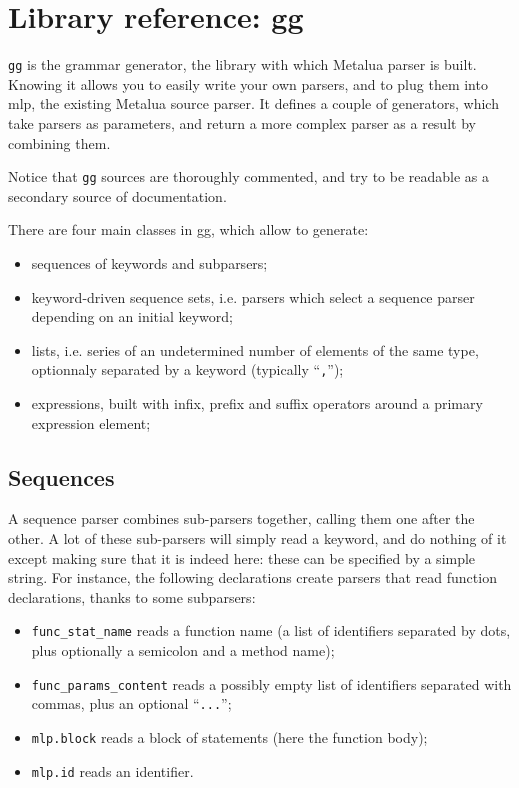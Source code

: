 \section{Library reference: gg}

\verb|gg| is the grammar generator, the library with which Metalua
parser is built. Knowing it allows you to easily write your own
parsers, and to plug them into mlp, the existing Metalua source
parser. It defines a couple of generators, which take parsers as
parameters, and return a more complex parser as a result by combining
them.

Notice that \verb|gg| sources are thoroughly commented, and try to be
readable as a secondary source of documentation.

There are four main classes in gg, which allow to generate:
\begin{itemize}
\item sequences of keywords and subparsers;
\item keyword-driven sequence sets, i.e. parsers which select a
  sequence parser depending on an initial keyword;
\item lists, i.e. series of an undetermined number of elements of the
  same type, optionnaly separated by a keyword (typically ``{\tt,}'');
\item expressions, built with infix, prefix and suffix operators
  around a primary expression element;
\end{itemize}



\subsection{Sequences}

A sequence parser combines sub-parsers together, calling them one after
the other. A lot of these sub-parsers will simply read a keyword, and
do nothing of it except making sure that it is indeed here: these can
be specified by a simple string. For instance, the following
declarations create parsers that read function declarations, thanks
to some subparsers:
\begin{itemize}
\item \verb|func_stat_name| reads a function name (a list of
  identifiers separated by dots, plus optionally a semicolon and a
  method name);
\item \verb|func_params_content| reads a possibly empty list of
  identifiers separated with commas, plus an optional ``\verb|...|'';
\item \verb|mlp.block| reads a block of statements (here the function
  body);
\item \verb|mlp.id| reads an identifier.
\end{itemize}

